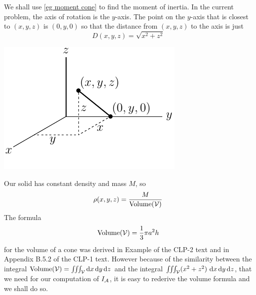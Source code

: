 \begin{eg}
We shall use \eqref{eg moment cone} to find the moment of inertia.
In the current problem, the axis of rotation is the $y$-axis. The point on the 
$y$-axis that is closest to $(x,y,z)$ is $(0,y,0)$ so that the distance from $(x,y,z)$ to the axis is just
\begin{equation*}
D(x,y,z) = \sqrt{x^2+z^2}
\end{equation*}
\begin{efig}
\begin{center}
    \includegraphics{cart6}
\end{center}
\end{efig}
Our solid has constant density and mass $M$, so
\begin{equation*}
\rho(x,y,z) = \frac{M}{\text{Volume}(\mathcal{V})}
\end{equation*}
The formula
\begin{equation*}
\text{Volume}(\mathcal{V})= \frac{1}{3} \pi a^2 h
\end{equation*}
for the volume of a cone was derived in Example  
of the CLP-2 text and in Appendix B.5.2 of the CLP-1 text. 
However because of the similarity between
the integral 
$\text{Volume}(\mathcal{V})=\iiint_{\mathcal{V}} \mathrm{d}x\,\mathrm{d}y\,\mathrm{d}z$ 
and the integral
$\tripInt_\cV (x^2+z^2)\ \dee{x}\,\dee{y}\,\dee{z}$, that we need for our
computation of $I_{\mathcal{A}}$, it is easy to rederive the volume formula and we 
shall do so.



\end{eg}
